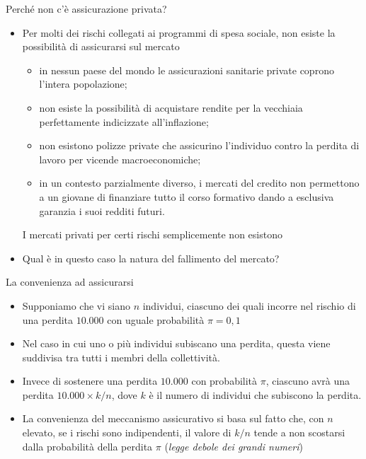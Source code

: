 \documentclass[aspectratio=64,11pt]{beamer}
\begin{document}
\begin{frame}{Perché non c'è assicurazione privata?}
\begin{itemize}
\item Per molti dei rischi collegati ai programmi di spesa sociale, non
esiste la possibilità di assicurarsi sul mercato
\begin{itemize}
\item in nessun paese del mondo le assicurazioni sanitarie private coprono
l'intera popolazione;
\item non esiste la possibilità di acquistare rendite per la vecchiaia
perfettamente indicizzate all'inflazione;
\item non esistono polizze private che assicurino l'individuo contro la perdita
di lavoro per vicende macroeconomiche;
\item in un contesto parzialmente diverso, i mercati del credito non permettono
a un giovane di finanziare tutto il corso formativo dando a esclusiva
garanzia i suoi redditi futuri.
\end{itemize}
I mercati privati per certi rischi semplicemente non esistono
\item Qual è in questo caso la natura del \alert{fallimento del mercato}?
\end{itemize}
\end{frame}

\begin{frame}{La convenienza ad assicurarsi}
\begin{itemize}
\item Supponiamo che vi siano \(n\) individui, ciascuno dei quali incorre nel
rischio di una perdita \(10.000\) con uguale probabilità \(\pi=0,1\)
\item Nel caso in cui uno o più individui subiscano una perdita, questa viene
suddivisa tra tutti i membri della collettività.
\item Invece di sostenere una perdita \(10.000\) con probabilità \(\pi\), ciascuno
avrà una perdita \(10.000\times k/n\), dove \(k\) è il numero di
individui che subiscono la perdita.
\item La convenienza del meccanismo assicurativo si basa sul fatto che, con \(n\)
elevato, \alert{se i rischi sono indipendenti}, il valore di \(k/n\) tende a non
scostarsi dalla probabilità della perdita \(\pi\) (\emph{legge debole dei grandi
numeri})
\end{itemize}
\end{frame}
\end{document}
